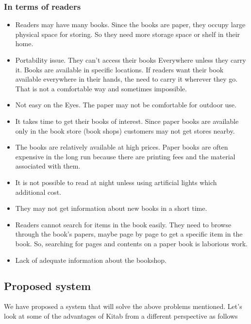 		\subsubsection{In terms of readers}

\begin{itemize}
	\item Readers may have many books. Since the books are paper, they occupy large physical space for storing. So they need more storage space or shelf in their home.
	\item Portability issue. They can’t access their books Everywhere unless they carry it. Books are available in specific locations. If readers want their book available everywhere in their hands, the need to carry it wherever they go. That is not a comfortable way and sometimes impossible.
	\item Not easy on the Eyes. The paper may not be comfortable for outdoor use.
	\item It takes time to get their books of interest. Since paper books are available only in the book store (book shops) customers may not get stores nearby.
	\item The books are relatively available at high prices. Paper books are often expensive in the long run because there are printing fees and the material associated with them.
	\item It is not possible to read at night unless using artificial lights which additional cost.
	\item They may not get information about new books in a short time.
	\item Readers cannot search for items in the book easily. They need to browse through the book's papers, maybe page by page to get a specific item in the book. So, searching for pages and contents on a paper book is laborious work.
	\item Lack of adequate information about the bookshop.
\end{itemize}

		\subsection{Proposed system}

We have proposed a system that will solve the above problems mentioned. Let’s look at some of the advantages of Kitab from a different perspective as follows


